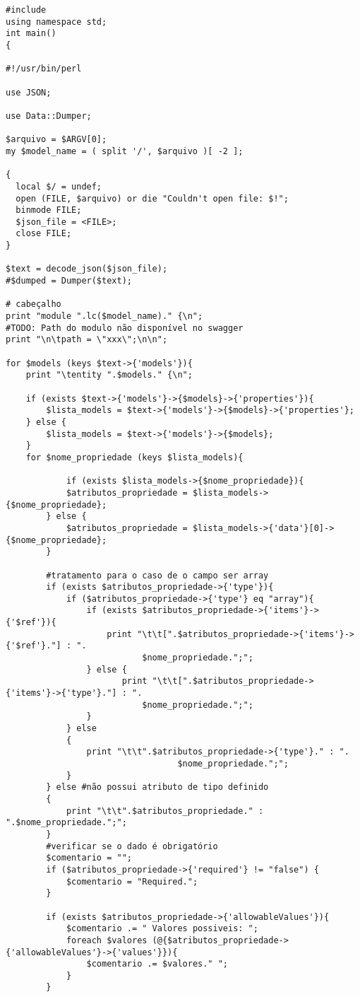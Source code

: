 \begin{lstlisting}
#include
using namespace std;
int main()
{

#!/usr/bin/perl

use JSON;

use Data::Dumper;

$arquivo = $ARGV[0];
my $model_name = ( split '/', $arquivo )[ -2 ];

{
  local $/ = undef;
  open (FILE, $arquivo) or die "Couldn't open file: $!";
  binmode FILE;
  $json_file = <FILE>;
  close FILE;
}

$text = decode_json($json_file);
#$dumped = Dumper($text);

# cabeçalho
print "module ".lc($model_name)." {\n";
#TODO: Path do modulo não disponível no swagger
print "\n\tpath = \"xxx\";\n\n";

for $models (keys $text->{'models'}){
	print "\tentity ".$models." {\n";

	if (exists $text->{'models'}->{$models}->{'properties'}){
		$lista_models = $text->{'models'}->{$models}->{'properties'};
	} else {
		$lista_models = $text->{'models'}->{$models};
	}
	for $nome_propriedade (keys $lista_models){
	
	        if (exists $lista_models->{$nome_propriedade}){
			$atributos_propriedade = $lista_models->{$nome_propriedade};		
		} else {
			$atributos_propriedade = $lista_models->{'data'}[0]->{$nome_propriedade};
		}
	
		#tratamento para o caso de o campo ser array
		if (exists $atributos_propriedade->{'type'}){
			if ($atributos_propriedade->{'type'} eq "array"){
				if (exists $atributos_propriedade->{'items'}->{'$ref'}){
					print "\t\t[".$atributos_propriedade->{'items'}->{'$ref'}."] : ".
		       		       $nome_propriedade.";";
				} else {
				       print "\t\t[".$atributos_propriedade->{'items'}->{'type'}."] : ".
		       		       $nome_propriedade.";";
				}
			} else
			{
				print "\t\t".$atributos_propriedade->{'type'}." : ".
        	                      $nome_propriedade.";";
			}
		} else #não possui atributo de tipo definido
		{
			print "\t\t".$atributos_propriedade." : ".$nome_propriedade.";";
		}
		#verificar se o dado é obrigatório
		$comentario = "";
		if ($atributos_propriedade->{'required'} != "false") {
			$comentario = "Required.";
		}

		if (exists $atributos_propriedade->{'allowableValues'}){
			$comentario .= " Valores possiveis: ";
			foreach $valores (@{$atributos_propriedade->{'allowableValues'}->{'values'}}){
				$comentario .= $valores." ";	
			}
		}


\end{lstlisting}
